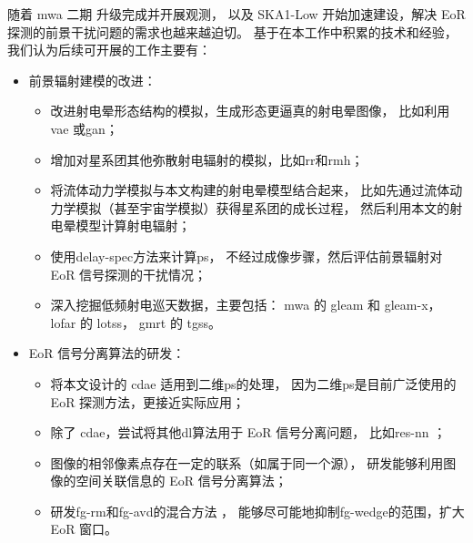 \begin{summary}
随着 \ac{mwa} 二期 \cite{wayth2018} 升级完成并开展观测，
以及 SKA1-Low 开始加速建设，解决 EoR 探测的前景干扰问题的需求也越来越迫切。
基于在本工作中积累的技术和经验，我们认为后续可开展的工作主要有：
\begin{itemize}
\item 前景辐射建模的改进：
  \begin{itemize}
    \item 改进射电晕形态结构的模拟，生成形态更逼真的射电晕图像，
      比如利用\ac{vae}\cite{kingma2013} 或\ac{gan}\cite{goodfellow2014}；
    \item 增加对星系团其他弥散射电辐射的模拟，比如\ac{rr}和\ac{rmh}；
    \item 将流体动力学模拟与本文构建的射电晕模型结合起来，
      比如先通过流体动力学模拟（甚至宇宙学模拟）获得星系团的成长过程，
      然后利用本文的射电晕模型计算射电辐射；
    \item 使用\ac{delay-spec}方法\cite{parsons2012}来计算\ac{ps}，
      不经过成像步骤，然后评估前景辐射对 EoR 信号探测的干扰情况；
    \item 深入挖掘低频射电巡天数据，主要包括：
      \ac{mwa} 的 \ac{gleam}\cite{wayth2015,hurleyWalker2017}
      和 \ac{gleam-x}\cite{hurleyWalker2017prop}，
      \ac{lofar} 的 \ac{lotss}\cite{shimwell2017,shimwell2019}，
      \ac{gmrt} 的 \ac{tgss}\cite{intema2017}。
  \end{itemize}

\item EoR 信号分离算法的研发：
  \begin{itemize}
    \item 将本文设计的 \ac{cdae} 适用到二维\ac{ps}的处理，
      因为二维\ac{ps}是目前广泛使用的 EoR 探测方法，更接近实际应用；
    \item 除了 \ac{cdae}，尝试将其他\ac{dl}算法用于 EoR 信号分离问题，
      比如\ac{res-nn} \cite{he2016}；
    \item 图像的相邻像素点存在一定的联系（如属于同一个源），
      研发能够利用图像的空间关联信息的 EoR 信号分离算法；
    \item 研发\ac{fg-rm}和\ac{fg-avd}的混合方法 \cite{kerrigan2018}，
      能够尽可能地抑制\ac{fg-wedge}的范围，扩大 EoR 窗口。
  \end{itemize}
\end{itemize}

\end{summary}
